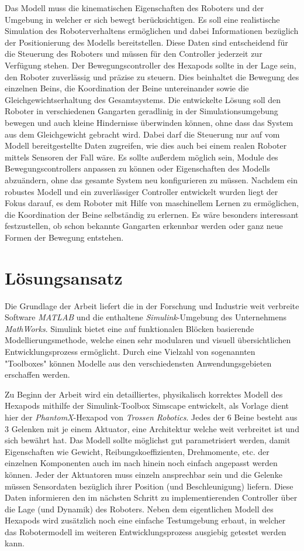 Das Modell muss die kinematischen Eigenschaften des Roboters und der Umgebung in welcher er sich bewegt berücksichtigen.
Es soll eine realistische Simulation des Roboterverhaltens ermöglichen und dabei Informationen bezüglich der Positionierung des Modells bereitstellen.
Diese Daten sind entscheidend für die Steuerung des Roboters und müssen für den Controller jederzeit zur Verfügung stehen.
Der Bewegungscontroller des Hexapods sollte in der Lage sein, den Roboter zuverlässig und präzise zu steuern.
Dies beinhaltet die Bewegung des einzelnen Beins, die Koordination der Beine untereinander sowie die Gleichgewichtserhaltung des Gesamtsystems.
Die entwickelte Lösung soll den Roboter in verschiedenen Gangarten geradlinig in der Simulationsumgebung bewegen und auch kleine Hindernisse überwinden können, ohne dass das System aus dem Gleichgewicht gebracht wird.
Dabei darf die Steuerung nur auf vom Modell bereitgestellte Daten zugreifen, wie dies auch bei einem realen Roboter mittels Sensoren der Fall wäre.
Es sollte außerdem möglich sein, Module des Bewegungscontrollers anpassen zu können oder Eigenschaften des Modells abzuändern, ohne das gesamte System neu konfigurieren zu müssen.
Nachdem ein robustes Modell und ein zuverlässiger Controller entwickelt wurden liegt der Fokus darauf, es dem Roboter mit Hilfe von maschinellem Lernen zu ermöglichen, die Koordination der Beine selbständig zu erlernen.
Es wäre besonders interessant festzustellen, ob schon bekannte Gangarten erkennbar werden oder ganz neue Formen der Bewegung entstehen.

\section{Lösungsansatz}
Die Grundlage der Arbeit liefert die in der Forschung und Industrie weit verbreite Software \textit{MATLAB\textregistered} und die enthaltene \textit{Simulink}\textregistered-Umgebung des Unternehmens \textit{MathWorks}.
Simulink bietet eine auf funktionalen Blöcken basierende Modellierungsmethode, welche einen sehr modularen und visuell übersichtlichen Entwicklungsprozess ermöglicht.
Durch eine Vielzahl von sogenannten "Toolboxes" können Modelle aus den verschiedensten Anwendungsgebieten erschaffen werden.

Zu Beginn der Arbeit wird ein detailliertes, physikalisch korrektes Modell des Hexapods mithilfe der Simulink-Toolbox Simscape entwickelt, als Vorlage dient hier der \emph{PhantomX}-Hexapod von \emph{Trossen Robotics}.
Jedes der 6 Beine besteht aus 3 Gelenken mit je einem Aktuator, eine Architektur welche weit verbreitet ist und sich bewährt hat.
Das Modell sollte möglichst gut parametrisiert werden, damit Eigenschaften wie Gewicht, Reibungskoeffizienten, Drehmomente, etc. der einzelnen Komponenten auch im nach hinein noch einfach angepasst werden können.
Jeder der Aktuatoren muss einzeln ansprechbar sein und die Gelenke müssen Sensordaten bezüglich ihrer Position (und Beschleunigung) liefern.
Diese Daten informieren den im nächsten Schritt zu implementierenden Controller über die Lage (und Dynamik) des Roboters.
Neben dem eigentlichen Modell des Hexapods wird zusätzlich noch eine einfache Testumgebung erbaut, in welcher das Robotermodell im weiteren Entwicklungsprozess ausgiebig getestet werden kann.

